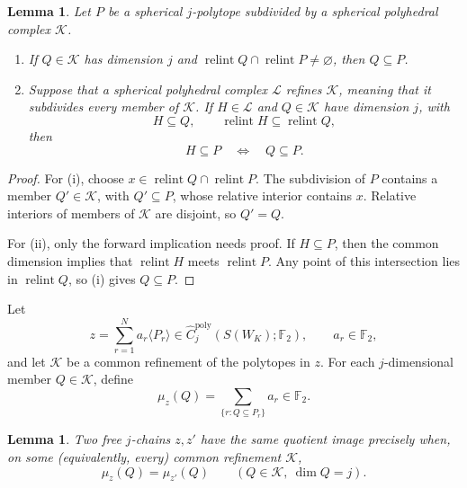 \documentclass[reqno,12pt]{amsart}
\newtheorem{lemma}[theorem]{Lemma}
\theoremstyle{definition}
\DeclareMathOperator{\relint}{relint}
\newcommand{\F}{\mathbb F_2}
\begin{document}
\begin{lemma}
\label{lem:refinement-membership}
Let \(P\) be a spherical \(j\)-polytope subdivided by a spherical
polyhedral complex \(\mathcal K\).

\begin{enumerate}[label=\textup{(\roman*)},leftmargin=*]
\item If \(Q\in\mathcal K\) has dimension \(j\) and
\(\relint Q\cap\relint P\ne\varnothing\), then \(Q\subseteq P\).

\item Suppose that a spherical polyhedral complex \(\mathcal L\)
refines \(\mathcal K\), meaning that it subdivides every member of
\(\mathcal K\).  If \(H\in\mathcal L\) and
\(Q\in\mathcal K\) have dimension \(j\), with
\[
 H\subseteq Q,
 \qquad
 \relint H\subseteq\relint Q,
\]
then
\[
 H\subseteq P\quad\Longleftrightarrow\quad Q\subseteq P.
\]
\end{enumerate}
\end{lemma}

\begin{proof}
For (i), choose
\(x\in\relint Q\cap\relint P\).  The subdivision of \(P\) contains a
member \(Q'\in\mathcal K\), with \(Q'\subseteq P\), whose relative
interior contains \(x\).  Relative interiors of members of
\(\mathcal K\) are disjoint, so \(Q'=Q\).

For (ii), only the forward implication needs proof.  If
\(H\subseteq P\), then the common dimension implies that
\(\relint H\) meets \(\relint P\).  Any point of this intersection
lies in \(\relint Q\), so (i) gives \(Q\subseteq P\).
\end{proof}

Let
\[
 z=\sum_{r=1}^Na_r\langle P_r\rangle
   \in\widehat C_j^{\mathrm{poly}}(S(W_K);\F),
 \qquad a_r\in\F,
\]
and let \(\mathcal K\) be a common refinement of the polytopes in
\(z\).  For each \(j\)-dimensional member \(Q\in\mathcal K\), define
\[
 \mu_z(Q)=\sum_{\{r:Q\subseteq P_r\}}a_r\in\F.
\]

\begin{lemma}\label{lem:coefficient-criterion}
Two free \(j\)-chains \(z,z'\) have the same quotient image precisely
when, on some (equivalently, every) common refinement \(\mathcal K\),
\[
 \mu_z(Q)=\mu_{z'}(Q)\qquad(Q\in\mathcal K,\ \dim Q=j).
\]
\end{lemma}
\end{document}
